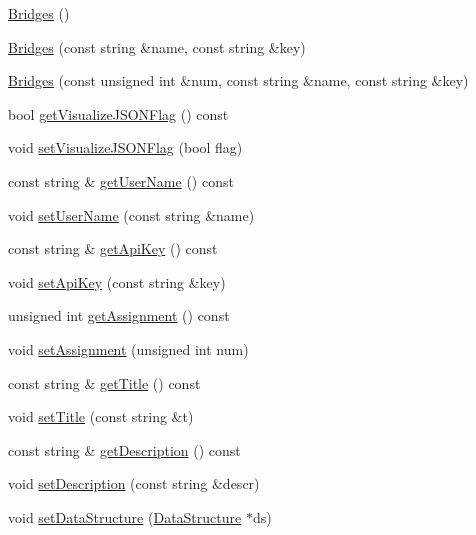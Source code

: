 \begin{DoxyCompactItemize}
\item 
\hyperlink{classbridges_1_1_bridges_aab8b250b2b5ba0034ceb2494fe5ea437}{Bridges} ()
\item 
\hyperlink{classbridges_1_1_bridges_a21d9e98cb1f3994300079b489f14e71e}{Bridges} (const string \&name, const string \&key)
\item 
\hyperlink{classbridges_1_1_bridges_a84162a660dec9f7bc11e1f01cada4179}{Bridges} (const unsigned int \&num, const string \&name, const string \&key)
\item 
bool \hyperlink{classbridges_1_1_bridges_a8cda221917feb2362cd5c6908380649f}{get\+Visualize\+J\+S\+O\+N\+Flag} () const 
\item 
void \hyperlink{classbridges_1_1_bridges_a69aca37ab2729d0345e0549d7baf0423}{set\+Visualize\+J\+S\+O\+N\+Flag} (bool flag)
\item 
const string \& \hyperlink{classbridges_1_1_bridges_a0812303f981177c298740aece5d21ad9}{get\+User\+Name} () const 
\item 
void \hyperlink{classbridges_1_1_bridges_ab0b00033e54d25968f5ecb61c31c7de3}{set\+User\+Name} (const string \&name)
\item 
const string \& \hyperlink{classbridges_1_1_bridges_a063fdd42d71eb9e1ecf6383e3b25db42}{get\+Api\+Key} () const 
\item 
void \hyperlink{classbridges_1_1_bridges_a3f9f21464393b8fce79a77809c6aa17e}{set\+Api\+Key} (const string \&key)
\item 
unsigned int \hyperlink{classbridges_1_1_bridges_ab1dea5b21e7041e65273f4838ae270d3}{get\+Assignment} () const 
\item 
void \hyperlink{classbridges_1_1_bridges_aca7a68fb8cc0d1bec81656dfa77b1162}{set\+Assignment} (unsigned int num)
\item 
const string \& \hyperlink{classbridges_1_1_bridges_a169843c1761a73e2ff393e78d4f76e20}{get\+Title} () const 
\item 
void \hyperlink{classbridges_1_1_bridges_ac9f2e0b5fd5c70053db233dcbb636b56}{set\+Title} (const string \&t)
\item 
const string \& \hyperlink{classbridges_1_1_bridges_a752d606eb889e1e9d65e9f4338d661fa}{get\+Description} () const 
\item 
void \hyperlink{classbridges_1_1_bridges_aa26285a4d04c2759113dcf233406a8da}{set\+Description} (const string \&descr)
\item 
void \hyperlink{classbridges_1_1_bridges_a7447e2d5808c492d26132690c1a639a7}{set\+Data\+Structure} (\hyperlink{classbridges_1_1_data_structure}{Data\+Structure} $\ast$ds)

\end{DoxyCompactItemize}
